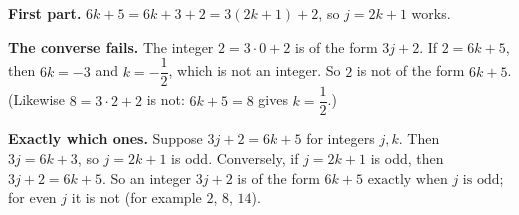 \textbf{First part.} $6k+5=6k+3+2=3(2k+1)+2$, so $j=2k+1$ works.

\textbf{The converse fails.} The integer $2=3\cdot0+2$ is of the form $3j+2$. If $2=6k+5$, then $6k=-3$ and $k=-\dfrac12$, which is not an integer. So $2$ is not of the form $6k+5$. (Likewise $8=3\cdot2+2$ is not: $6k+5=8$ gives $k=\dfrac12$.)

\textbf{Exactly which ones.} Suppose $3j+2=6k+5$ for integers $j,k$. Then $3j=6k+3$, so $j=2k+1$ is odd. Conversely, if $j=2k+1$ is odd, then $3j+2=6k+5$. So an integer $3j+2$ is of the form $6k+5$ $\boxed{\text{exactly when } j \text{ is odd}}$; for even $j$ it is not (for example $2$, $8$, $14$).
